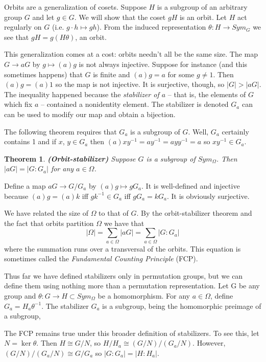 \documentclass[letterpaper]{article}
\newtheorem{theorem}{Theorem}[section]
\newenvironment{proof}[1][Proof]{\begin{trivlist}
\item[\hskip \labelsep {\bfseries #1}]}{\end{trivlist}}
\begin{document}
Orbits are a generalization of cosets. Suppose $H$ is a subgroup
of an arbitrary group $G$ and let $g \in G$. We will show that the
coset $gH$ is an orbit. Let $H$ act regularly on $G$ (i.e. $g\cdot
h \mapsto gh$). From the induced representation $\theta \colon H
\rightarrow Sym_G$ we see that $gH = g(H\theta)$, an orbit.

This generalization comes at a cost: orbits needn't all be the same
size. The map $G \rightarrow aG$ by $g \mapsto (a)g$ is not always
injective. Suppose for instance (and this sometimes happens) that
$G$ is finite and $(a)g = a$ for some $g \ne 1$. Then $(a)g = (a)1$
so the map is not injective. It is surjective, though, so $|G| >
|aG|$. The inequality happened because the \emph{stabilizer of $a$}
-- that is, the elements of $G$ which fix $a$ -- contained a
nonidentity element. The stabilizer is denoted $G_a$ can can be
used to modify our map and obtain a bijection.

The following theorem requires that $G_a$ is a subgroup of $G$.
Well, $G_a$ certainly contains 1 and if $x$, $y \in G_a$ then
$(a)xy^{-1} = ay^{-1} = ayy^{-1} = a$ so $xy^{-1} \in G_a$.

\begin{theorem}
\emph{\textbf{(Orbit-stabilizer)}}
Suppose $G$ is a subgroup of $Sym_\Omega$. Then $|aG| = |G \colon
G_a|$ for any $a \in \Omega$.
\end{theorem}
\begin{proof}
Define a map $aG \rightarrow G/G_a$ by $(a)g \mapsto gG_a$. It is
well-defined and injective because $(a)g = (a)k$ iff $gk^{-1} \in
G_a$ iff $gG_a = kG_a$. It is obviously surjective.
\end{proof}

We have related the size of $\Omega$ to that of $G$. By the
orbit-stabilizer theorem and the fact that orbits partition $\Omega$
we have that \[|\Omega| = \sum_{a \in \Omega} |aG| = \sum_{a \in
\Omega} |G \colon G_a|\] where the summation runs over a transversal
of the orbits. This equation is sometimes called the \emph{Fundamental
Counting Principle} (FCP).

Thus far we have defined stabilizers only in permutation groups,
but we can define them using nothing more than a permutation
representation. Let G be any group and $\theta \colon G \rightarrow
H \subset Sym_\Omega$ be a homomorphism. For any $a \in \Omega$,
define $G_a = H_a\theta^{-1}$. The stabilizer $G_a$ is a subgroup,
being the homomorphic  preimage of a subgroup,

The FCP remains true under this broader definition of stabilizers. To see this, let $N = \ker \theta$. Then $H \cong G/N$, so $H/H_a \cong (G/N)/(G_a/N)$. However, $(G/N)/(G_a/N) \cong G/G_a$ so $|G \colon G_a| = |H \colon H_a|$.
\end{document}
